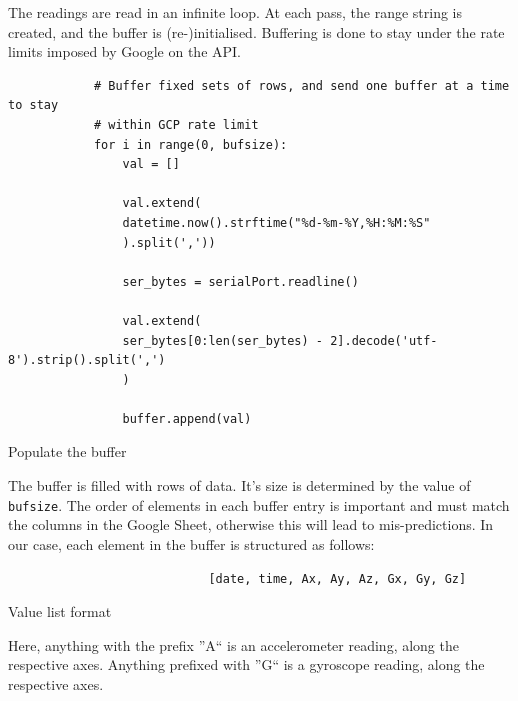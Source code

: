 \documentclass[a4paper,12pt]{report}
\newenvironment{code}{\captionsetup{type=listing}}{}
\begin{document}
The readings are read in an infinite loop. At each pass, the range string is
created, and the buffer is (re-)initialised. Buffering is done to stay under
the rate limits imposed by Google on the API.

\begin{code}
    \begin{verbatim}
            # Buffer fixed sets of rows, and send one buffer at a time to stay
            # within GCP rate limit
            for i in range(0, bufsize):
                val = []

                val.extend(
                datetime.now().strftime("%d-%m-%Y,%H:%M:%S"
                ).split(','))

                ser_bytes = serialPort.readline()

                val.extend(
                ser_bytes[0:len(ser_bytes) - 2].decode('utf-8').strip().split(',')
                )

                buffer.append(val)
    \end{verbatim}
    \caption{Populate the buffer}
    \label{code:popbuf}
\end{code}
\vspace{0.5cm}

The buffer is filled with rows of data. It's size is determined by the value of
\texttt{bufsize}. The order of elements in each buffer entry is important and
must match the columns in the Google Sheet, otherwise this will lead to
mis-predictions. In our case, each element in the buffer is structured as
follows:
\begin{code}
    \begin{verbatim}
                            [date, time, Ax, Ay, Az, Gx, Gy, Gz]
    \end{verbatim}
    \caption{Value list format}
    \label{code:vallist}
\end{code}
\vspace{0.5cm}

Here, anything with the prefix ''A`` is an accelerometer reading, along the
respective axes. Anything prefixed with ''G`` is a gyroscope reading, along the
respective axes.
\end{document}
